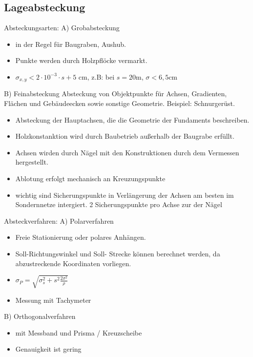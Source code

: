 \documentclass[12pt]{article}
\begin{document}
\subsection{Lageabsteckung}
Absteckungsarten: \newline
A) Grobabsteckung
\begin{itemize}
\item in der Regel für Baugraben, Aushub.
\item Punkte werden durch Holzpflöcke vermarkt.
\item $\sigma_{x,y} < 2 \cdot 10^{-3} \cdot s + 5$ cm, z.B: bei $s=20$m, $\sigma<6,5$cm
\end{itemize}
B) Feinabsteckung \newline
Absteckung von Objektpunkte für Achsen, Gradienten, Flächen und Gebäudeecken sowie sonstige Geometrie. Beispiel: Schnurgerüst.
\begin{itemize}
\item Absteckung der Hauptachsen, die die Geometrie der Fundaments beschreiben. 
\item Holzkonstanktion wird durch Baubetrieb außerhalb der Baugrabe erfüllt.
\item Achsen wirden durch Nägel mit den Konstruktionen durch dem Vermessen hergestellt.
\item Ablotung erfolgt mechanisch an Kreuzungspunkte
\item wichtig sind Sicherungspunkte in Verlängerung der Achsen am besten im Sondernnetze intergiert. 2 Sicherungspunkte pro Achse zur der Nägel
\end{itemize}
Absteckverfahren: \newline
A) Polarverfahren
\begin{itemize}
\item Freie Stationierung oder polares Anhängen.
\item Soll-Richtungswinkel und Soll- Strecke können berechnet werden, da abzustreckende Koordinaten vorliegen.
\item $\sigma_P = \sqrt{\sigma_s^2 + s^2 \frac{2\sigma^2}{\rho}}$
\item Messung mit Tachymeter
\end{itemize}
B) Orthogonalverfahren
\begin{itemize}
\item mit Messband und Prisma / Kreuzscheibe
\item Genauigkeit ist gering
\end{itemize}
\begin{figure}[ht]\centering
\end{figure}
\end{document}
